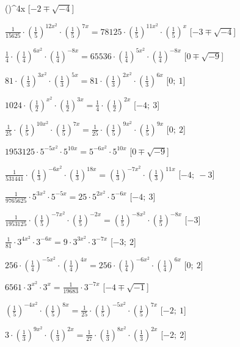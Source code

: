 \begin{esercizio}
\begin{enumeratea}
\left(\right)^{{4x}}\)
   \hfill [\(-2 \mp \sqrt{-4}\)]
  \item  \(\frac{1}{15625} \cdot \left(\frac{1}{5}\right)^{{12x^2}} \cdot 
\left(\frac{1}{5}\right)^{{7x}} = 78125 \cdot \left(\frac{1}{5}\right)^{{11x^2}} 
\cdot \left(\frac{1}{5}\right)^{{x}}\)
   \hfill [\(-3 \mp \sqrt{-4}\)]
  \item  \(\frac{1}{4} \cdot \left(\frac{1}{4}\right)^{{6x^2}} \cdot 
\left(\frac{1}{4}\right)^{{-8x}} = 65536 \cdot \left(\frac{1}{4}\right)^{{5x^2}} 
\cdot \left(\frac{1}{4}\right)^{{-8x}}\)
   \hfill [\(0 \mp \sqrt{-9}\)]
  \item  \(81 \cdot \left(\frac{1}{3}\right)^{{3x^2}} \cdot 
\left(\frac{1}{3}\right)^{{5x}} = 81 \cdot \left(\frac{1}{3}\right)^{{2x^2}} 
\cdot \left(\frac{1}{3}\right)^{{6x}}\)
   \hfill [\(0;~1\)]
  \item  \(1024 \cdot \left(\frac{1}{2}\right)^{{x^2}} \cdot 
\left(\frac{1}{2}\right)^{{3x}} = \frac{1}{4} \cdot 
\left(\frac{1}{2}\right)^{{2x}}\)
   \hfill [\(-4;~3\)]
  \item  \(\frac{1}{25} \cdot \left(\frac{1}{5}\right)^{{10x^2}} \cdot 
\left(\frac{1}{5}\right)^{{7x}} = \frac{1}{25} \cdot 
\left(\frac{1}{5}\right)^{{9x^2}} \cdot \left(\frac{1}{5}\right)^{{9x}}\)
   \hfill [\(0;~2\)]
  \item  \(1953125 \cdot 5^{{-5x^2}} \cdot 5^{{10x}} = 5^{{-6x^2}} \cdot 
5^{{10x}}\)
   \hfill [\(0 \mp \sqrt{-9}\)]
  \item  \(\frac{1}{531441} \cdot \left(\frac{1}{3}\right)^{{-6x^2}} \cdot 
\left(\frac{1}{3}\right)^{{18x}} = \left(\frac{1}{3}\right)^{{-7x^2}} \cdot 
\left(\frac{1}{3}\right)^{{11x}}\)
   \hfill [\(-4;~-3\)]
  \item  \(\frac{1}{9765625} \cdot 5^{{3x^2}} \cdot 5^{{-5x}} = 25 \cdot 
5^{{2x^2}} \cdot 5^{{-6x}}\)
   \hfill [\(-4;~3\)]
  \item  \(\frac{1}{1953125} \cdot \left(\frac{1}{5}\right)^{{-7x^2}} \cdot 
\left(\frac{1}{5}\right)^{{-2x}} = \left(\frac{1}{5}\right)^{{-8x^2}} \cdot 
\left(\frac{1}{5}\right)^{{-8x}}\)
   \hfill [\(-3\)]
  \item  \(\frac{1}{81} \cdot 3^{{4x^2}} \cdot 3^{{-6x}} = 9 \cdot 3^{{3x^2}} 
\cdot 3^{{-7x}}\)
   \hfill [\(-3;~2\)]
  \item  \(256 \cdot \left(\frac{1}{4}\right)^{{-5x^2}} \cdot 
\left(\frac{1}{4}\right)^{{4x}} = 256 \cdot \left(\frac{1}{4}\right)^{{-6x^2}} 
\cdot \left(\frac{1}{4}\right)^{{6x}}\)
   \hfill [\(0;~2\)]
  \item  \(6561 \cdot 3^{{x^2}} \cdot 3^{{x}} = \frac{1}{19683} \cdot 
3^{{-7x}}\)
   \hfill [\(-4 \mp \sqrt{-1}\)]
  \item  \(\left(\frac{1}{5}\right)^{{-4x^2}} \cdot 
\left(\frac{1}{5}\right)^{{8x}} = \frac{1}{25} \cdot 
\left(\frac{1}{5}\right)^{{-5x^2}} \cdot \left(\frac{1}{5}\right)^{{7x}}\)
   \hfill [\(-2;~1\)]
  \item  \(3 \cdot \left(\frac{1}{3}\right)^{{9x^2}} \cdot 
\left(\frac{1}{3}\right)^{{2x}} = \frac{1}{27} \cdot 
\left(\frac{1}{3}\right)^{{8x^2}} \cdot \left(\frac{1}{3}\right)^{{2x}}\)
   \hfill [\(-2;~2\)]
 \end{enumeratea}
\end{esercizio}


